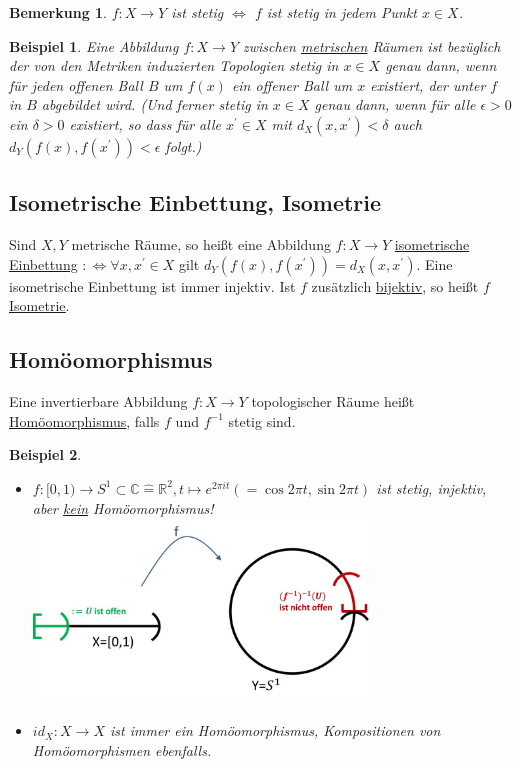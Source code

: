 \documentclass[a4paper,11pt,notitlepage]{report}
\newtheorem{remark}{Bemerkung}[chapter]
\newtheorem{example}{Beispiel}[chapter]
\newcommand{\R}{{\ensuremath{\mathbb{R}}}}
\newcommand{\C}{{\ensuremath{\mathbb{C}}}}
\newenvironment{Kasten}[1]
{
\hspace{0.05\linewidth}
\begin{center}
\begin{minipage}{0.9\linewidth}
\setlength{\fboxsep}{10pt}
\definecolor{shadecolor}{gray}{1}
\definecolor{framecolor}{gray}{0}
\def\FrameCommand{\fcolorbox{framecolor}{shadecolor}}
\MakeFramed {\FrameRestore}
\subsection{#1}
\begin{itshape}
}
{
\end{itshape}
\endMakeFramed
\end{minipage}
\end{center}
}
\begin{document}
\begin{remark}
	$f \colon X \rightarrow Y$ ist stetig $\Leftrightarrow$ $f$ ist stetig in jedem Punkt $x \in X$.
\end{remark}

\begin{example}
	Eine Abbildung $f \colon X \rightarrow Y$ zwischen \underline{metrischen} Räumen ist bezüglich der von den Metriken induzierten Topologien stetig in $x \in X$ genau dann, wenn für jeden offenen Ball $B$ um $f(x)$ ein offener Ball um $x$ existiert, der unter $f$ in $B$ abgebildet wird. (Und ferner stetig in $x \in X$ genau dann, wenn für alle $\epsilon > 0$ ein $\delta > 0$ existiert, so dass für alle $x^\prime \in X$ mit $d_X(x,x^\prime) < \delta$ auch $d_Y \left( f(x), f(x^\prime) \right) < \epsilon$ folgt.) 
\end{example}

\begin{Kasten}{Isometrische Einbettung, Isometrie}
	Sind $X,Y$ metrische Räume, so heißt eine Abbildung $f \colon X \rightarrow Y$ \underline{isometrische Einbettung}
	\newline	
	 $: \Leftrightarrow \forall x, x^\prime \in X$ gilt $d_Y \left ( f(x), f(x^\prime) \right ) = d_X (x, x^\prime)$.
	\newline
	Eine isometrische Einbettung ist immer injektiv.
	\newline
	Ist $f$ zusätzlich \underline{bijektiv}, so heißt $f$ \underline{\underline{Isometrie}}. 
\end{Kasten}

\begin{Kasten}{Homöomorphismus}
	Eine invertierbare Abbildung $f \colon X \rightarrow Y$ topologischer Räume heißt \underline{Homöomorphismus}, falls $f$ und $f^{-1}$ stetig sind.
\end{Kasten}

\begin{example}
	\begin{itemize}
		\item $f \colon [0,1) \rightarrow S^1 \subset \C \hat{=} \R^2, t \mapsto e^{2 \pi i t} (= \cos {2 \pi t}, \sin {2 \pi t})$ ist stetig, injektiv, aber \underline{kein} Homöomorphismus!
		\newline
		\includegraphics[width=0.7\textwidth]{images/0_1_nach_S1_f-1_nicht_stetig.jpg}
		\item $id_X \colon X \rightarrow X$ ist immer ein Homöomorphismus, Kompositionen von Homöomorphismen ebenfalls.
	\end{itemize}
\end{example}
\end{document}
